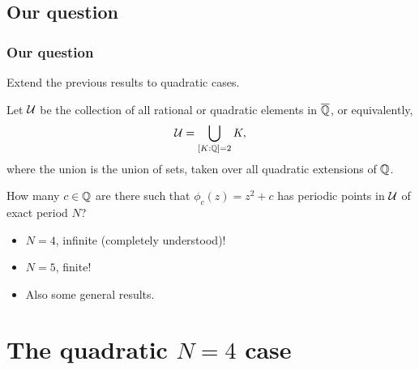 \documentclass[aspectratio=1610]{beamer}
\begin{document}
\subsection{Our question}

\begin{frame}
  \frametitle{Our question}

  Extend the previous results to quadratic cases.

  \pause

  \begin{definition}
    Let $\mathcal{U}$ be the collection of all rational or quadratic elements
    in $\overline{\mathbb{Q}}$, or equivalently,
    \[
    \mathcal{U} = \bigcup_{[K : \mathbb{Q}] = 2}K,
    \]
    where the union is the union of sets, taken over all quadratic
    extensions of $\mathbb{Q}$.
  \end{definition}

  \pause

  \begin{question}
    \label{question}
    How many $c \in \mathbb{Q}$ are there such that $\phi_c(z) = z^2 + c$ has
    periodic points in $\mathcal{U}$ of exact period $N$?
  \end{question}

  \pause

  \begin{answer}
    \begin{itemize}
    \item $N = 4$, infinite (completely understood)!
    \item $N = 5$, finite!
    \item Also some general results.
    \end{itemize}
  \end{answer}
\end{frame}

\section{The quadratic $N = 4$ case}
\end{document}
